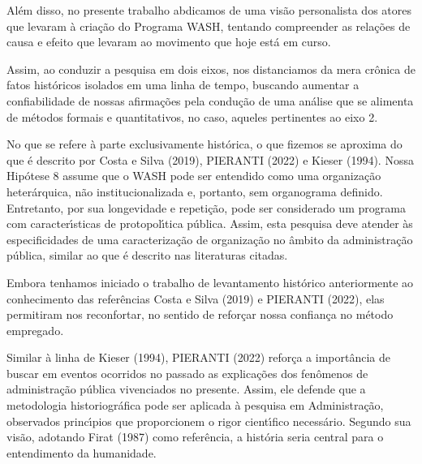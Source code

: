 \documentclass[
12pt,		%
openright,	%
twoside,  %
a4paper,			%
chapter=TITLE,		%
english,			%
french,				%
spanish,			%
brazil				%
]{USPSC-classe/USPSC}
\begin{document}
Al\'em disso, no presente trabalho abdicamos de uma vis\~ao personalista dos atores que levaram \`a cria\c{c}\~ao do Programa WASH, tentando compreender as rela\c{c}\~oes de causa e efeito que levaram ao movimento que hoje est\'a em curso.








Assim, ao conduzir a pesquisa em dois eixos, nos distanciamos da mera cr\^onica de fatos hist\'oricos isolados em uma linha de tempo, buscando aumentar a confiabilidade de nossas afirma\c{c}\~oes pela condu\c{c}\~ao de uma an\'alise que se alimenta de m\'etodos formais e quantitativos, no caso, aqueles pertinentes ao eixo 2.








No que se refere \`a parte exclusivamente hist\'orica, o que fizemos se aproxima do que \'e descrito por   Costa e Silva (2019), PIERANTI (2022) e  Kieser (1994). Nossa Hip\'otese 8 assume que o WASH pode ser entendido como uma organiza\c{c}\~ao heter\'arquica, n\~ao institucionalizada e, portanto, sem organograma definido. Entretanto, por sua longevidade e repeti\c{c}\~ao, pode ser considerado um programa com caracter\'{\i}sticas de protopol\'{\i}tica p\'ublica. Assim, esta pesquisa deve atender \`as especificidades de uma caracteriza\c{c}\~ao de organiza\c{c}\~ao no \^ambito da administra\c{c}\~ao p\'ublica, similar ao que \'e descrito nas literaturas citadas.








Embora tenhamos iniciado o trabalho de levantamento hist\'orico anteriormente ao conhecimento das refer\^encias  Costa e Silva (2019) e  PIERANTI (2022), elas permitiram nos reconfortar, no sentido de refor\c{c}ar nossa confian\c{c}a no m\'etodo empregado.








Similar \`a linha de  Kieser (1994),  PIERANTI (2022) refor\c{c}a a import\^ancia de buscar em eventos ocorridos no passado as explica\c{c}\~oes dos fen\^omenos de administra\c{c}\~ao p\'ublica vivenciados no presente. Assim, ele defende que \textquotedbl a metodologia historiogr\'afica pode ser aplicada \`a pesquisa em Administra\c{c}\~ao\textquotedbl , observados princ\'{\i}pios que proporcionem o rigor cient\'{\i}fico necess\'ario. Segundo sua vis\~ao, adotando  Firat (1987) como refer\^encia, a hist\'oria seria \textquotedbl central para o entendimento da humanidade\textquotedbl .
\end{document}
